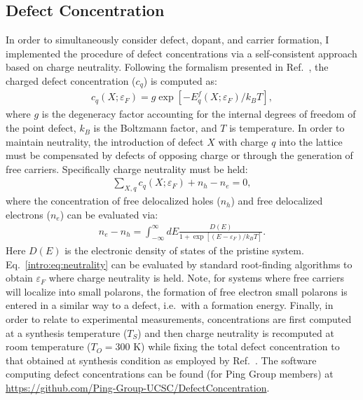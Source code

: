\subsection{Defect Concentration}
In order to simultaneously consider defect, dopant, and carrier formation, I implemented the procedure of defect concentrations via a self-consistent approach based on charge neutrality. Following the formalism presented in Ref.~\cite{freysoldt2014first}, the charged defect concentration ($c_q$) is computed as:
\begin{align}
    c_q(X; \varepsilon_F) = g \exp [- E^f_q(X; \varepsilon_F) / k_B T],
\end{align}
where $g$ is the degeneracy factor accounting for the internal degrees of freedom of the point defect, $k_B$ is the Boltzmann factor, and $T$ is temperature. In order to maintain neutrality, the introduction of defect $X$ with charge $q$ into the lattice must be compensated by defects of opposing charge or through the generation of free carriers. Specifically charge neutrality must be held:
\begin{align}
    \sum_{X,q} c_q(X; \varepsilon_F) + n_h - n_e = 0, \label{intro:eq:neutrality}
\end{align}
where the concentration of free delocalized holes ($n_h$) and free delocalized electrons ($n_e$) can be evaluated via:
\begin{align}
    n_e - n_h = \int_{-\infty}^{\infty} dE \frac{D(E)}{1+\exp[(E-\varepsilon_F)/k_B T]}.
\end{align}
Here $D(E)$ is the electronic density of states of the pristine system. Eq.~\ref{intro:eq:neutrality} can be evaluated by standard root-finding algorithms to obtain $\varepsilon_F$ where charge neutrality is held.
Note, for systems where free carriers will localize into small polarons, the formation of free electron small polarons is entered in a similar way to a defect, i.e.\ with a formation energy.
Finally, in order to relate to experimental measurements, concentrations are first computed at a synthesis temperature ($T_S$) and then charge neutrality is recomputed at room temperature ($T_O=300$ K) while fixing the total defect concentration to that obtained at synthesis condition as employed by Ref.~\cite{lee2013thermodynamics}.
The software computing defect concentrations can be found (for Ping Group members) at \url{https://github.com/Ping-Group-UCSC/DefectConcentration}.


